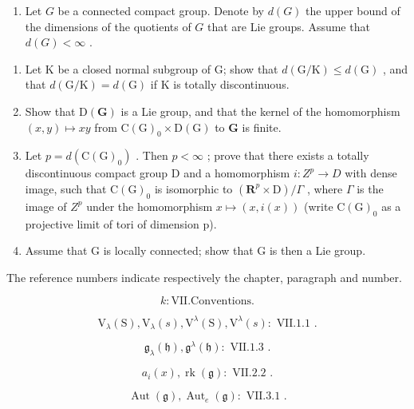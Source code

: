 
\begin{enumerate}
\def\labelenumi{\arabic{enumi})}
\tightlist
\item
  Let \(G\) be a connected compact group. Denote by \(d(G)\) the upper bound of the dimensions of the quotients of \(G\) that are Lie groups. Assume that \(d(G) < \infty\) .
\end{enumerate}

\begin{enumerate}
\def\labelenumi{\alph{enumi})}
\item
  Let K be a closed normal subgroup of G; show that \(d(\mathrm{G}/\mathrm{K}) \leq d(\mathrm{G})\) , and that \(d(\mathrm{G}/\mathrm{K}) = d(\mathrm{G})\) if K is totally discontinuous.
\item
  Show that \(\mathrm{D}(\mathbf{G})\) is a Lie group, and that the kernel of the homomorphism \((x,y)\mapsto xy\) from \(\mathrm{C}(\mathrm{G})_0\times \mathrm{D}(\mathrm{G})\) to \(\mathbf{G}\) is finite.
\item
  Let \(p = d(\mathrm{C}(\mathrm{G})_{0})\) . Then \(p < \infty\) ; prove that there exists a totally discontinuous compact group D and a homomorphism \(i : Z^{p} \to D\) with dense image, such that \(\mathrm{C}(\mathrm{G})_{0}\) is isomorphic to \((\mathbf{R}^{p} \times \mathrm{D}) / \Gamma\) , where \(\Gamma\) is the image of \(Z^{p}\) under the homomorphism \(x \mapsto (x, i(x))\) (write \(\mathrm{C}(\mathrm{G})_{0}\) as a projective limit of tori of dimension p).
\item
  Assume that G is locally connected; show that G is then a Lie group.
\end{enumerate}


The reference numbers indicate respectively the chapter, paragraph and number.

\[
k \colon \mathrm{VII.Conventions}.
\]

\[
\mathrm{V} _ {\lambda} (\mathrm{S}), \mathrm{V} _ {\lambda} (s), \mathrm{V} ^ {\lambda} (\mathrm{S}), \mathrm{V} ^ {\lambda} (s) \colon \text { VII.1.1 }.
\]

\[
\mathfrak {g} _ {\lambda} (\mathfrak {h}), \mathfrak {g} ^ {\lambda} (\mathfrak {h}) \colon \text { VII.1.3 }.
\]

\[
a _ {i} (x), \operatorname{rk} (\mathfrak {g}): \text { VII.2.2 }.
\]

\[
\operatorname{Aut} (\mathfrak {g}), \operatorname{Aut} _ {e} (\mathfrak {g}): \text { VII.3.1 }.
\]


